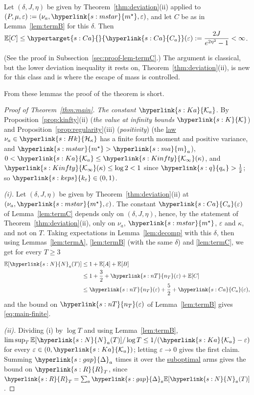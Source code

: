 \documentclass[11pt]{article}
\newcommand{\E}{\mathbb{E}}
\newcommand{\dt}[1]{\hypertarget{#1}{}}
\newcommand{\sy}[2]{{\hyperlink{#1}{#2}}}
\newcommand{\term}[2]{\hyperlink{#1}{#2}}
\newcommand{\marm}{\sy{s:ma}{m}}
\newcommand{\mstar}{\sy{s:mstar}{m^{\star}}}
\newcommand{\gap}{\sy{s:gap}{\Delta}}
\newcommand{\Hk}{\sy{s:Hk}{\mathcal{H}_{\kappa}}}
\newcommand{\Kc}{\sy{s:K}{\mathcal{K}}}
\newcommand{\qk}{\sy{s:q}{q_{\kappa}}}
\newcommand{\Kinfty}{\sy{s:Kinfty}{\mathcal{K}_{\infty}}}
\newcommand{\Np}{\sy{s:N}{N}}
\newcommand{\Reg}{\sy{s:R}{R}}
\newcommand{\Ka}{\sy{s:Ka}{\mathcal{K}_{a}}}
\newcommand{\nT}{\sy{s:nT}{n_{T}}}
\newcommand{\kep}{\sy{s:keps}{k_{\varepsilon}}}
\newcommand{\Ca}{\sy{s:Ca}{C_{a}}}
\begin{document}
\begin{lemma}[The \term{w:subopt}{suboptimal} arm]\label{lem:termC}
Let $(\delta,J,\eta)$ be given by Theorem~\ref{thm:deviation}(ii) applied to $(P,\mu,\varepsilon):=(\nu_a,\mstar,\varepsilon)$, and let
$C$ be as in Lemma~\ref{lem:termB} for this $\delta$. Then
$\E[C]\le\dt{s:Ca}\Ca(\varepsilon):=\dfrac{2J}{e^{2\eta^2}-1}<\infty$.
\end{lemma}

(See the proof in Subsection~\ref{sec:proof-lem-termC}.) The argument is classical, but the lower deviation
inequality it rests on, Theorem~\ref{thm:deviation}(ii), is new for this class and is where the escape of mass
is controlled.

From these lemmas the proof of the theorem is short.

\begin{proof}[Proof of Theorem~\ref{thm:main}]
\emph{The constant $\Ka$.} By Proposition~\ref{prop:kinfty}(ii) (\emph{the value at infinity bounds $\Kc$}) and Proposition~\ref{prop:regularity}(iii) (\emph{positivity}) (the \term{w:law}{law}
$\nu_a\in\Hk$ has a finite fourth moment and positive variance, and $\mstar>\marm_a$), $0<\Ka\le\Kinfty(\kappa)$, and
$\Kinfty(\kappa)\le\log2<1$ since $\qk>\frac12$; so $\kep\in(0,1)$.

\emph{(i).} Let $(\delta,J,\eta)$ be given by Theorem~\ref{thm:deviation}(ii) at $(\nu_a,\mstar,\varepsilon)$. The constant
$\Ca(\varepsilon)$ of Lemma~\ref{lem:termC} depends only on $(\delta,J,\eta)$, hence, by the statement of
Theorem~\ref{thm:deviation}(ii), only on $\nu_a$, $\mstar$, $\varepsilon$ and $\kappa$, and not on $T$. Taking expectations in
Lemma~\ref{lem:decomp} with this $\delta$, then using Lemmas~\ref{lem:termA}, \ref{lem:termB} (with the same $\delta$) and
\ref{lem:termC}, we get for every $T\ge3$
\begin{align*}
  \E[\Np_a(T)]&\le1+\E[A]+\E[B]\\
  &\le1+\frac32+\nT(\varepsilon)+\E[C]\\
  &\le\nT(\varepsilon)+\frac52+\Ca(\varepsilon),
\end{align*}
and the bound on $\nT(\varepsilon)$ of Lemma~\ref{lem:termB} gives \eqref{eq:main-finite}.

\emph{(ii).} Dividing (i) by $\log T$ and using Lemma~\ref{lem:termB},
$\limsup_T\E[\Np_a(T)]/\log T\le1/(\Ka-\varepsilon)$ for every $\varepsilon\in(0,\Ka)$; letting $\varepsilon\to0$ gives the first claim. Summing
$\gap_a$ times it over the \term{w:subopt}{suboptimal} arms gives the bound on $\Reg_T$, since $\Reg_T=\sum_a\gap_a\E[\Np_a(T)]$.
\end{proof}
\end{document}
